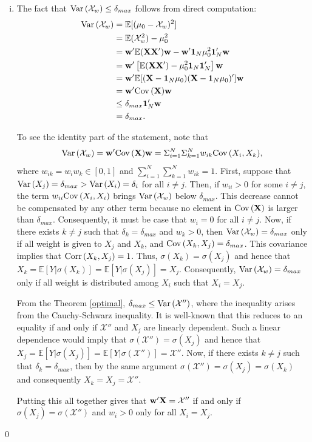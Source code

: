 \documentclass[11pt]{article}
\newcommand{\E}{\mathbb{E}}
\theoremstyle{definition}
\theoremstyle{definition}
\def\one{{\bf 1}}
\def\w{{\bf w}}
\def\X{{\bf X}}
\def\E{{\mathbb E}}
\def\Var{{\rm Var}\,}
\def\Cov{{\rm Cov}\,}
\def\Corr{{\rm Corr}\,}
\begin{document}
\begin{enumerate}[i)]
\item The fact that $\Var(\mathcal{X}_w)\leq \delta_{max}$ follows from direct computation:
\begin{align*}
\Var(\mathcal{X}_w) &= \E[(\mu_0 - \mathcal{X}_w)^2]\\
&= \E(\mathcal{X}_w^2) - \mu_0^2\\
&= \w' \E(\X \X')\w - \w'\one_N \mu_0^2\one_N'\w\\
&= \w' \left[ \E(\X \X') - \mu_0^2 \one_N \one_N' \right]\w\\
&= \w' \E[(\X - \one_N \mu_0)(\X - \one_N \mu_0)']\w\\
&= \w' \Cov(\X)\w\\
&\leq \delta_{max} \one_N'\w\\
&= \delta_{max}.
\end{align*}

To see the identity part of the statement, note that $$\Var(\mathcal{X}_w)  = \w' \Cov(\X)\w = \Sigma_{i=1}^N \Sigma_{k=1}^N w_{ik} \Cov(X_i, X_k),$$ where $w_{ik} = w_iw_k \in [0,1]$ and $\sum_{i=1}^N \sum_{k=1}^N w_{ik} = 1$.  First, suppose that $\Var(X_j) = \delta_{max} > \Var(X_i) = \delta_i$ for all $i \neq j$. Then, if $w_{ii} > 0$ for some $i \neq j$, the term $w_{ii}\Cov(X_i, X_i)$ brings $\Var(\mathcal{X}_w)$ below $\delta_{max}$. This decrease cannot be compensated by any other term because no element in $\Cov(\X)$ is larger than $\delta_{max}$. Consequently, it must be case that $w_i = 0$ for all $i \neq j$. Now, if there exists $k \neq j$ such that $\delta_k = \delta_{max}$ and $w_k > 0$, then $\Var(\mathcal{X}_w) = \delta_{max}$ only if all weight is given to $X_j$ and $X_k$, and $\Cov(X_k, X_j) = \delta_{max}$. This covariance implies that $\Corr(X_k, X_j) = 1$. Thus, $\sigma(X_k) = \sigma(X_j)$ and hence that $X_k = \E[Y | \sigma(X_k)] = \E[Y | \sigma(X_j)] = X_j$. Consequently, $\Var(\mathcal{X}_w) = \delta_{max}$ only if all weight is distributed among $X_i$ such that $X_i = X_j$. 

 From the Theorem \ref{optimal}, $\delta_{max} \leq \Var(\mathcal{X}'')$, where the inequality arises from the Cauchy-Schwarz inequality. It is well-known that this reduces to an equality if and only if $\mathcal{X}''$ and $X_j$ are linearly dependent. Such a linear dependence would imply that $\sigma(\mathcal{X}'') = \sigma(X_j)$ and hence that $X_j = \E[Y | \sigma(X_j)] = \E[Y | \sigma(\mathcal{X}'')] = \mathcal{X}''$. Now, if there exists $k \neq j$ such that $\delta_k = \delta_{max}$, then by the same argument $\sigma(\mathcal{X}'') = \sigma(X_j) = \sigma(X_k)$ and consequently $X_k = X_j = \mathcal{X}''$. 

Putting this all together gives that $\w'\X = \mathcal{X}''$ if and only if $\sigma(X_j) = \sigma(\mathcal{X}'')$ and $w_i > 0$ only for all $X_i = X_j$.

\end{enumerate}
\qed
\end{document}

